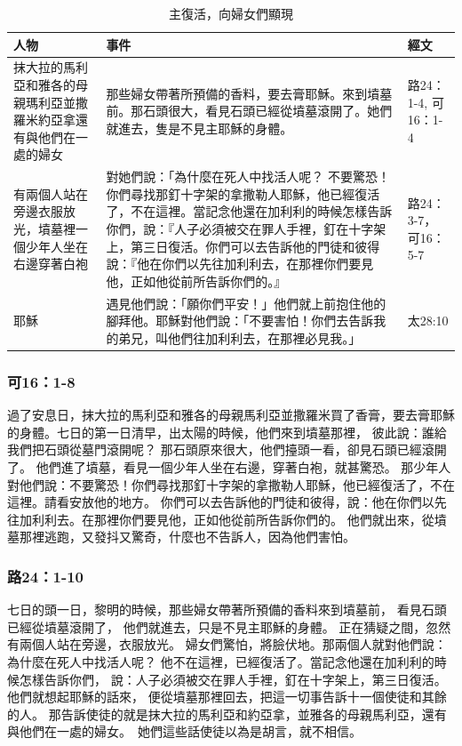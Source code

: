\begin{table}[htbp]
  \centering
    \begin{tabular}{|l|l|l|}
       \toprule
  \multicolumn{1}{|p{12.645em}|}{\textbf{人物}} & \multicolumn{1}{p{24.43em}|}{\textbf{事件}} & \multicolumn{1}{p{3.57em}|}{\textbf{經文}} \\
      \midrule
 \multicolumn{1}{|p{12.645em}|}{抹大拉的馬利亞和雅各的母親瑪利亞並撒羅米約亞拿還有與他們在一處的婦女} & \multicolumn{1}{p{24.43em}|}{那些婦女帶著所預備的香料，要去膏耶穌。來到墳墓前。那石頭很大，看見石頭已經從墳墓滾開了。她們就進去，隻是不見主耶穌的身體。} & \multicolumn{1}{p{3.57em}|}{路24：1-4, 可16：1-4 }\\
      \midrule 
 \multicolumn{1}{|p{12.645em}|}{有兩個人站在旁邊衣服放光，墳墓裡一個少年人坐在右邊穿著白袍} & \multicolumn{1}{p{24.43em}|}{對她們說：「為什麼在死人中找活人呢？ 不要驚恐！你們尋找那釘十字架的拿撒勒人耶穌，他已經復活了，不在這裡。當記念他還在加利利的時候怎樣告訴你們，說：『人子必須被交在罪人手裡，釘在十字架上，第三日復活。你們可以去告訴他的門徒和彼得說：『他在你們以先往加利利去，在那裡你們要見他，正如他從前所告訴你們的。』} &\multicolumn{1}{p{3.57em}|}{ 路24：3-7，可16：5-7} \\
 
  \midrule 
\multirow{1}{*}{耶穌} & \multicolumn{1}{p{24.43em}|}{遇見他們說：「願你們平安！」他們就上前抱住他的腳拜他。耶穌對他們說：「不要害怕！你們去告訴我的弟兄，叫他們往加利利去，在那裡必見我。」 } & 太28:10 \\
  
    \bottomrule
    \end{tabular}%
     \caption{主復活，向婦女們顯現}
  \label{tab:addlabel}%
\end{table}

\subsubsection{可16：1-8}
過了安息日，抹大拉的馬利亞和雅各的母親馬利亞並撒羅米買了香膏，要去膏耶穌的身體。七日的第一日清早，出太陽的時候，他們來到墳墓那裡，
彼此說：誰給我們把石頭從墓門滾開呢？
那石頭原來很大，他們擡頭一看，卻見石頭已經滾開了。
他們進了墳墓，看見一個少年人坐在右邊，穿著白袍，就甚驚恐。
那少年人對他們說：不要驚恐！你們尋找那釘十字架的拿撒勒人耶穌，他已經復活了，不在這裡。請看安放他的地方。
你們可以去告訴他的門徒和彼得，說：他在你們以先往加利利去。在那裡你們要見他，正如他從前所告訴你們的。
他們就出來，從墳墓那裡逃跑，又發抖又驚奇，什麼也不告訴人，因為他們害怕。

\subsubsection{路24：1-10}
七日的頭一日，黎明的時候，那些婦女帶著所預備的香料來到墳墓前，
看見石頭已經從墳墓滾開了，
他們就進去，只是不見主耶穌的身體。
正在猜疑之間，忽然有兩個人站在旁邊，衣服放光。
婦女們驚怕，將臉伏地。那兩個人就對他們說：為什麼在死人中找活人呢？
他不在這裡，已經復活了。當記念他還在加利利的時候怎樣告訴你們，
說：人子必須被交在罪人手裡，釘在十字架上，第三日復活。
他們就想起耶穌的話來，
便從墳墓那裡回去，把這一切事告訴十一個使徒和其餘的人。
那告訴使徒的就是抹大拉的馬利亞和約亞拿，並雅各的母親馬利亞，還有與他們在一處的婦女。
 她們這些話使徒以為是胡言，就不相信。 
